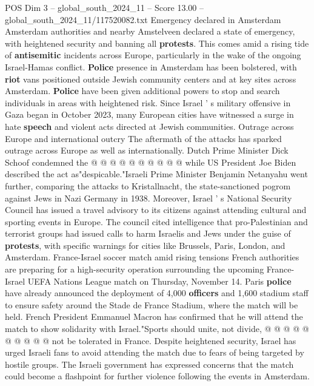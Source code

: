 \begin{textsample}{POS Dim 3 – global\_south\_2024\_11 – Score 13.00 – global\_south\_2024\_11/117520082.txt}
Emergency declared in Amsterdam Amsterdam authorities and nearby Amstelveen declared a state of emergency, with heightened security and banning all \textbf{protests}.
This comes amid a rising tide of \textbf{antisemitic} incidents across Europe, particularly in the wake of the ongoing Israel-Hamas conflict. \textbf{Police} presence in Amsterdam has been bolstered, with \textbf{riot} vans positioned outside Jewish community centers and at key sites across Amsterdam. \textbf{Police} have been given additional powers to stop and search individuals in areas with heightened risk.
Since Israel ' s military offensive in Gaza began in October 2023, many European cities have witnessed a surge in hate \textbf{speech} and violent acts directed at Jewish communities.
Outrage across Europe and international outcry The aftermath of the attacks has sparked outrage across Europe as well as internationally.
Dutch Prime Minister Dick Schoof condemned the @ @ @ @ @ @ @ @ @ @ while US President Joe Biden described the act as"despicable."Israeli Prime Minister Benjamin Netanyahu went further, comparing the attacks to Kristallnacht, the state-sanctioned pogrom against Jews in Nazi Germany in 1938.
Moreover, Israel ' s National Security Council has issued a travel advisory to its citizens against attending cultural and sporting events in Europe.
The council cited intelligence that pro-Palestinian and terrorist groups had issued calls to harm Israelis and Jews under the guise of \textbf{protests}, with specific warnings for cities like Brussels, Paris, London, and Amsterdam.
France-Israel soccer match amid rising tensions French authorities are preparing for a high-security operation surrounding the upcoming France-Israel UEFA Nations League match on Thursday, November 14.
Paris \textbf{police} have already announced the deployment of 4,000 \textbf{officers} and 1,600 stadium staff to ensure safety around the Stade de France Stadium, where the match will be held.
French President Emmanuel Macron has confirmed that he will attend the match to show solidarity with Israel."Sports should unite, not divide, @ @ @ @ @ @ @ @ @ @ not be tolerated in France.
Despite heightened security, Israel has urged Israeli fans to avoid attending the match due to fears of being targeted by hostile groups.
The Israeli government has expressed concerns that the match could become a flashpoint for further violence following the events in Amsterdam.

\end{textsample}
